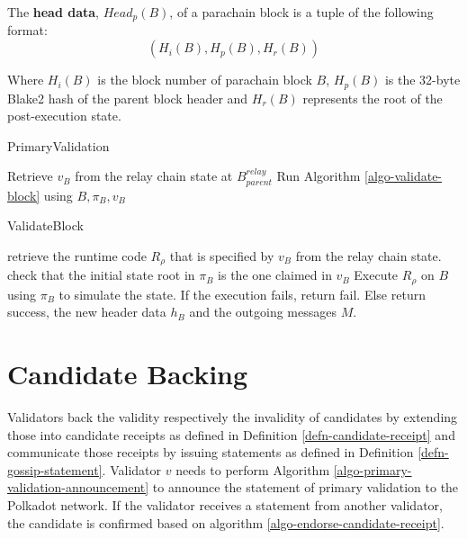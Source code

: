 \begin{definition}
  \label{defn-head-data}
  The \textbf{head data}, $Head_p(B)$, of a parachain block is a tuple of the following format:
  \[
    (H_i(B), H_p(B), H_r(B))
  \]

  Where $H_i(B)$ is the block number of parachain block $B$, $H_p(B)$ is the
  32-byte Blake2 hash of the parent block header and $H_r(B)$ represents the
  root of the post-execution state.
\end{definition}

\begin{algorithm}[H]
  \caption[]{\sc PrimaryValidation}
  \label{algo-primary-validation}
  \begin{algorithmic}[1]

    \State Retrieve $v_B$ from the relay chain state at $B^{relay}_{parent}$
    \State Run Algorithm \ref{algo-validate-block} using $B, \pi_B, v_B$
  \end{algorithmic}
\end{algorithm}

\begin{algorithm}[H]
  \caption[]{\sc ValidateBlock}
  \label{algo-validate-block}
  \begin{algorithmic}[1]
    \State retrieve the runtime code $R_\rho$ that is specified by $v_B$ from the relay chain state.
    \State check that the initial state root in $\pi_B$ is the one claimed in $v_B$
    \State Execute $R_\rho$ on $B$ using $\pi_B$ to simulate the state.
    \State If the execution fails, return fail.
    \State Else return success, the new header data $h_B$ and the outgoing messages $M$. 
  \end{algorithmic}
\end{algorithm}

\section{Candidate Backing}
\label{sect-primary-validaty-announcement}

Validators back the validity respectively the invalidity of candidates by
extending those into candidate receipts as defined in Definition
\ref{defn-candidate-receipt} and communicate those receipts by issuing
statements as defined in Definition \ref{defn-gossip-statement}. Validator $v$
needs to perform Algorithm \ref{algo-primary-validation-announcement} to
announce the statement of primary validation to the Polkadot network. If the
validator receives a statement from another validator, the candidate is
confirmed based on algorithm \ref{algo-endorse-candidate-receipt}.
\newline

